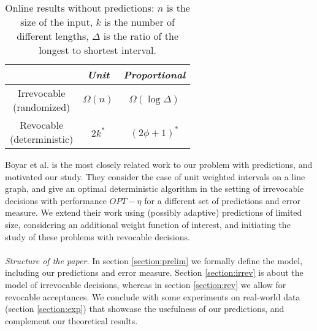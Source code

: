 \begin{table}[h]\centering
	\caption{Online results without predictions: $n$ is the size of the input, $k$ is the number of different lengths, $\Delta$ is the ratio of the longest to shortest interval.}
	\label{tab:prev_work}
	\begin{tabular}{c  c  c}%
		 & \textit{Unit} & \textit{Proportional} \\ \toprule
		\parbox[c]{2cm}{Irrevocable \\ (randomized)}  & $\Omega(n)$ \cite{bachmann2013online} & $\Omega(\log\Delta)$ \cite{lipton1994online} \\ \midrule
		\parbox[c]{2cm}{Revocable \\ (deterministic)} & $2k^*$ \cite{borodin2023any} & $(2\phi + 1)^*$ \cite{garay1997efficient,tomkins1995lower}  \\
  \bottomrule
	\end{tabular}
\end{table}

Boyar et al. \cite{boyar2023online} is the most closely related work to our problem with predictions, and motivated our study. They consider the case of unit weighted intervals on a line graph, and give an optimal deterministic algorithm in the setting of irrevocable decisions with performance $OPT - \eta$ for a different set of predictions and error measure. We extend their work using (possibly adaptive) predictions of limited size, considering an additional weight function of interest, and initiating the study of these problems with revocable decisions.\\\\
\textit{Structure of the paper.} In section \ref{section:prelim} we formally define the model, including our predictions and error measure. Section \ref{section:irrev} is about the model of irrevocable decisions, whereas in section \ref{section:rev} we allow for revocable acceptances. We conclude with some experiments on real-world data (section \ref{section:exp}) that showcase the usefulness of our predictions, and complement our theoretical results.